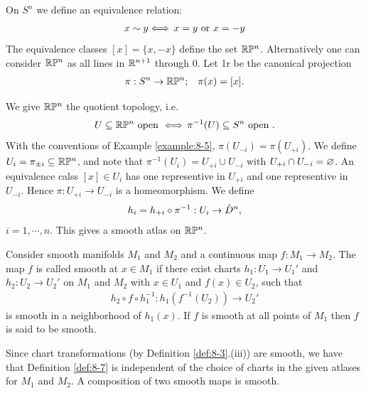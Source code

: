 \begin{example}\label{example:8-6}
  On $S^n$ we define an equivalence relation:
  \begin{align*}
    x\sim y \Longleftrightarrow\, x = y \text{ or } x = -y
  \end{align*}
  The equivalence classes $[x] = \{x, -x\}$ define the set $\mathbb{R}\mathbb{P}^n$. Alternatively one can
  consider $\mathbb{R}\mathbb{P}^n$ as all lines in $\mathbb{R}^{n+1}$ through 0. Let 1r be the canonical projection
  \begin{align*}
    \pi:S^n\to \mathbb{R}\mathbb{P}^n; && \pi(x) = [x].
  \end{align*}

  We give $\mathbb{R}\mathbb{P}^n$ the quotient topology, i.e.
  \begin{align*}
    U\subseteq \mathbb{R}\mathbb{P}^n \text{ open } \Longleftrightarrow\, \pi^{-1}(U)\subseteq S^n \text{ open }.
  \end{align*}
  With the conventions of Example \ref{example:8-5}, $\pi(U_{-i}) = \pi(U_{+i})$. We define 
  $U_i = \pi_{\pm i}\subseteq \mathbb{R}\mathbb{P}^n$, and note that $\pi^{-1}(U_i) = U_{+i}\cup U_{-i}$ with 
  $U_{+i}\cap U_{-i}=\varnothing$. An equivalence calss $[x]\in U_i$ has one representive in $U_{+i}$ and 
  one representive in $U_{-i}$. Hence $\pi:U_{+i}\to U_{-i}$ is a homeomorphism. We define
  \begin{align*}
    h_i = h_{+i}\circ \pi^{-1}:U_i\to\mathring{D}^n,
  \end{align*}
  $i=1, \cdots, n$. This gives a smooth atlas on $\mathbb{R}\mathbb{P}^n$.
\end{example}

\begin{definition}\label{def:8-7}
  Consider smooth manifolds $M_1$ and $M_2$ and a continuous map $f: M_1\to M_2$.
  The map $f$ is called smooth at $x\in M_1$ if there exist charts
  $h_1:U_1\to U_1'$ and $h_2:U_2\to U_2'$ on $M_1$ and $M_2$ with $x\in U_1$ and $f(x)\in U_2$,
  such that
  \begin{align*}
    h_2\circ f\circ h_1^{-1}:h_1(f^{-1}(U_2))\to U_2'
  \end{align*}
  is smooth in a neighborhood of $h_1(x)$. If $f$ is smooth at all points of $M_1$ then $f$ is said 
  to be smooth.
\end{definition}

Since chart transformations (by Definition \ref{def:8-3}.(iii)) are smooth, we have that
Definition \ref{def:8-7} is independent of the choice of charts in the given atlases for $M_1$
and $M_2$. A composition of two smooth maps is smooth. 

